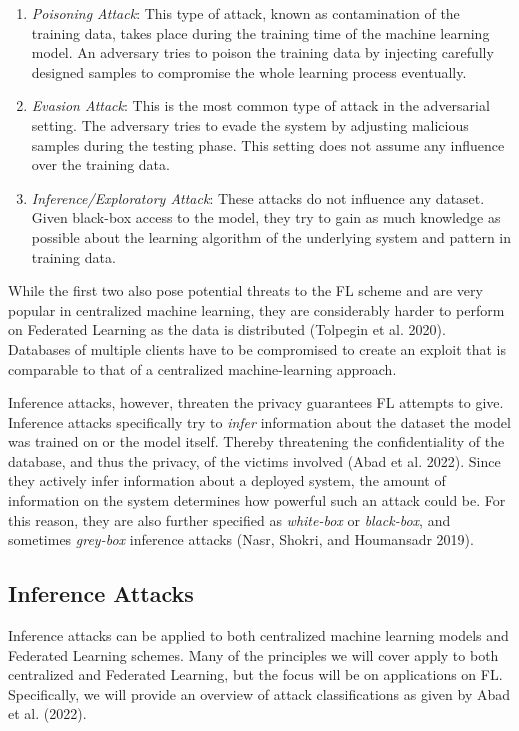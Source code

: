 \documentclass[
  compsoc]{IEEEtran}
\begin{document}
\begin{enumerate}
\def\labelenumi{\arabic{enumi}.}
\item
  \emph{Poisoning Attack}: This type of attack, known as contamination
  of the training data, takes place during the training time of the
  machine learning model. An adversary tries to poison the training data
  by injecting carefully designed samples to compromise the whole
  learning process eventually.
\item
  \emph{Evasion Attack}: This is the most common type of attack in the
  adversarial setting. The adversary tries to evade the system by
  adjusting malicious samples during the testing phase. This setting
  does not assume any influence over the training data.
\item
  \emph{Inference/Exploratory Attack}: These attacks do not influence
  any dataset. Given black-box access to the model, they try to gain as
  much knowledge as possible about the learning algorithm of the
  underlying system and pattern in training data.
\end{enumerate}

While the first two also pose potential threats to the FL scheme and are
very popular in centralized machine learning, they are considerably
harder to perform on Federated Learning as the data is distributed
(Tolpegin et al. 2020). Databases of multiple clients have to be
compromised to create an exploit that is comparable to that of a
centralized machine-learning approach.

Inference attacks, however, threaten the privacy guarantees FL attempts
to give. Inference attacks specifically try to \emph{infer} information
about the dataset the model was trained on or the model itself. Thereby
threatening the confidentiality of the database, and thus the privacy,
of the victims involved (Abad et al. 2022). Since they actively infer
information about a deployed system, the amount of information on the
system determines how powerful such an attack could be. For this reason,
they are also further specified as \emph{white-box} or \emph{black-box},
and sometimes \emph{grey-box} inference attacks (Nasr, Shokri, and
Houmansadr 2019).

\hypertarget{inference-attacks}{%
\subsection{Inference Attacks}\label{inference-attacks}}

Inference attacks can be applied to both centralized machine learning
models and Federated Learning schemes. Many of the principles we will
cover apply to both centralized and Federated Learning, but the focus
will be on applications on FL. Specifically, we will provide an overview
of attack classifications as given by Abad et al. (2022).
\end{document}
